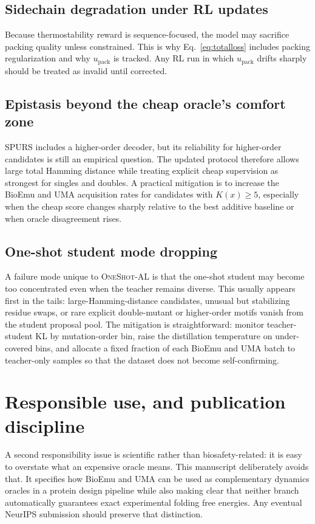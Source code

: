 \documentclass[11pt]{article}
\newcommand{\packunc}{\ensuremath{u_{\mathrm{pack}}}}
\newcommand{\methodIII}{\textsc{OneShot-AL}}
\begin{document}
\subsection{Sidechain degradation under RL updates}

Because thermostability reward is sequence-focused, the model may sacrifice packing quality unless constrained. This is why Eq.~\eqref{eq:totalloss} includes packing regularization and why \packunc{} is tracked. Any RL run in which \packunc{} drifts sharply should be treated as invalid until corrected.

\subsection{Epistasis beyond the cheap oracle's comfort zone}

SPURS includes a higher-order decoder, but its reliability for higher-order candidates is still an empirical question. The updated protocol therefore allows large total Hamming distance while treating explicit cheap supervision as strongest for singles and doubles. A practical mitigation is to increase the BioEmu and UMA acquisition rates for candidates with $K(x)\ge 5$, especially when the cheap score changes sharply relative to the best additive baseline or when oracle disagreement rises.

\subsection{One-shot student mode dropping}

A failure mode unique to \methodIII{} is that the one-shot student may become too concentrated even when the teacher remains diverse. This usually appears first in the tails: large-Hamming-distance candidates, unusual but stabilizing residue swaps, or rare explicit double-mutant or higher-order motifs vanish from the student proposal pool. The mitigation is straightforward: monitor teacher-student KL by mutation-order bin, raise the distillation temperature on under-covered bins, and allocate a fixed fraction of each BioEmu and UMA batch to teacher-only samples so that the dataset does not become self-confirming.

\section{Responsible use, and publication discipline}

A second responsibility issue is scientific rather than biosafety-related: it is easy to overstate what an expensive oracle means. This manuscript deliberately avoids that. It specifies how BioEmu and UMA can be used as complementary dynamics oracles in a protein design pipeline while also making clear that neither branch automatically guarantees exact experimental folding free energies. Any eventual NeurIPS submission should preserve that distinction.
\end{document}

